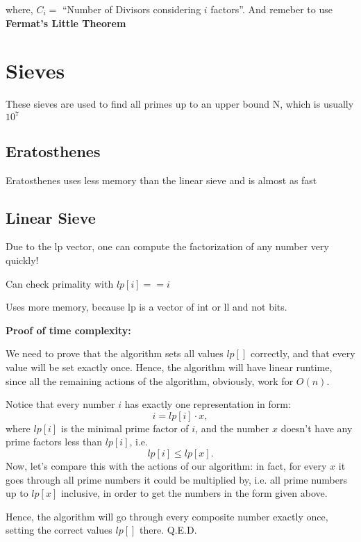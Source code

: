 where, $ C_i = $ ``Number of Divisors considering $i$ factors''.
And remeber to use \textbf{Fermat's Little Theorem}



\section{Sieves}

    These sieves are used to find all primes up to an upper bound N, which is usually $10^7$

    \subsection{Eratosthenes}

        Eratosthenes uses less memory than the linear sieve and is almost as fast


    \subsection{Linear Sieve}

        Due to the lp vector, one can compute the factorization of any number very quickly!

        Can check primality with $lp[i] == i$

        Uses more memory, because lp is a vector of int or ll and not bits.

        \textbf{Proof of time complexity:}

        We need to prove that the algorithm sets all values
        $lp[]$ correctly, and that every value will be set exactly once. 
        Hence, the algorithm will have linear runtime, since all the remaining actions of the algorithm, obviously, work for
        $O(n)$.

        Notice that every number $i$ has exactly one representation in form:
        $$i = lp [i] \cdot x,$$
        where 
        $lp [i]$ is the minimal prime factor of 
        $i$, and the number 
        $x$ doesn't have any prime factors less than 
        $lp [i]$, i.e.
        $$lp [i] \le lp [x].$$
        Now, let's compare this with the actions of our algorithm: in fact, for every 
        $x$ it goes through all prime numbers it could be multiplied by, i.e. all prime numbers up to 
        $lp [x]$ inclusive, in order to get the numbers in the form given above.

        Hence, the algorithm will go through every composite number exactly once, setting the correct values 
        $lp []$ there. Q.E.D.

